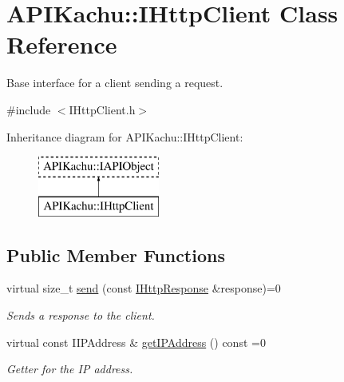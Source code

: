 \hypertarget{class_a_p_i_kachu_1_1_i_http_client}{}\section{A\+P\+I\+Kachu\+:\+:I\+Http\+Client Class Reference}
\label{class_a_p_i_kachu_1_1_i_http_client}


Base interface for a client sending a request.  




{\ttfamily \#include $<$I\+Http\+Client.\+h$>$}

Inheritance diagram for A\+P\+I\+Kachu\+:\+:I\+Http\+Client\+:\begin{figure}[H]
\begin{center}
\leavevmode
\includegraphics[height=2.000000cm]{class_a_p_i_kachu_1_1_i_http_client}
\end{center}
\end{figure}
\subsection*{Public Member Functions}
\begin{DoxyCompactItemize}
\item 
virtual size\+\_\+t \hyperlink{class_a_p_i_kachu_1_1_i_http_client_a8a6f4cfb1f5cc6b75ba45f707e5aa7bd}{send} (const \hyperlink{class_a_p_i_kachu_1_1_i_http_response}{I\+Http\+Response} \&response)=0
\begin{DoxyCompactList}\small\item\em Sends a response to the client. \end{DoxyCompactList}\item 
virtual const I\+I\+P\+Address \& \hyperlink{class_a_p_i_kachu_1_1_i_http_client_a023c2fcc94ae6757ec1fc0a27cccba1d}{get\+I\+P\+Address} () const  =0\hypertarget{class_a_p_i_kachu_1_1_i_http_client_a023c2fcc94ae6757ec1fc0a27cccba1d}{}\label{class_a_p_i_kachu_1_1_i_http_client_a023c2fcc94ae6757ec1fc0a27cccba1d}

\begin{DoxyCompactList}\small\item\em Getter for the IP address. \end{DoxyCompactList}\end{DoxyCompactItemize}


